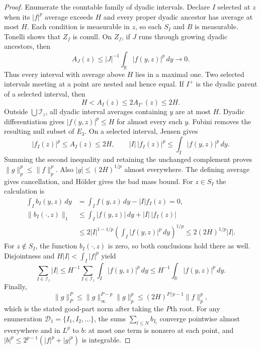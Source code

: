 \documentclass[12pt,reqno]{amsart}
\theoremstyle{plain}
\theoremstyle{definition}
\theoremstyle{remark}
\numberwithin{equation}{section}
\newcommand{\R}{\mathbb R}
\newcommand{\dd}{\,d}
\begin{document}
\begin{proof}
Enumerate the countable family of dyadic intervals. Declare $I$
selected at $z$ when its $|f|^p$ average exceeds $H$ and every
proper dyadic ancestor has average at most $H$. Each condition is
measurable in $z$, so each $S_I$ and $B$ is measurable. Tonelli
shows that $Z_f$ is conull. On $Z_f$, if $J$ runs through growing
dyadic ancestors, then
\[
 A_J(z)\le |J|^{-1}\int_\R|f(y,z)|^p\dd y\longrightarrow0.
\]
Thus every interval with average above $H$ lies in a maximal one.
Two selected intervals meeting at a point are nested and hence equal.
If $I^+$ is the dyadic parent of a selected interval, then
\[
 H<A_I(z)\le2A_{I^+}(z)\le2H.
\]
Outside $\bigcup\mathcal I_z$, all dyadic interval averages
containing $y$ are at most $H$. Dyadic differentiation gives
$|f(y,z)|^p\le H$ for almost every such $y$. Fubini removes the
resulting null subset of $E_3$. On a selected interval, Jensen gives
\[
 |f_I(z)|^p\le A_I(z)\le2H,\qquad
 |I|\,|f_I(z)|^p\le\int_I|f(y,z)|^p\dd y.
\]
Summing the second inequality and retaining the unchanged complement
proves $\|g\|_p^p\le\|f\|_p^p$. Also $|g|\le(2H)^{1/p}$
almost everywhere. The defining average gives cancellation, and
H\"older gives the bad mass bound. For $z\in S_I$ the calculation is
\begin{align*}
 \int_I b_I(y,z)\dd y&=\int_I f(y,z)\dd y-|I|f_I(z)=0,\\
 \|b_I(\cdot,z)\|_1
 &\le\int_I|f(y,z)|\dd y+|I|\,|f_I(z)|\\
 &\le2|I|^{1-1/p}\left(\int_I|f(y,z)|^p\dd y\right)^{1/p}
 \le2(2H)^{1/p}|I|.
\end{align*}
For $z\notin S_I$, the function $b_I(\cdot,z)$ is zero, so both
conclusions hold there as well.
Disjointness and $H|I|<\int_I|f|^p$ yield
\[
 \sum_{I\in\mathcal I_z}|I|
 \le H^{-1}\sum_{I\in\mathcal I_z}\int_I|f(y,z)|^p\dd y
 \le H^{-1}\int_\R|f(y,z)|^p\dd y.
\]
Finally,
\[
 \|g\|_P^P\le\|g\|_\infty^{P-p}\|g\|_p^p
 \le(2H)^{P/p-1}\|f\|_p^p,
\]
which is the stated good-part norm after taking the $P$th root.
For any enumeration $\mathcal D_1=\{I_1,I_2,\ldots\}$, the sums
$\sum_{l\le N}b_{I_l}$ converge pointwise almost everywhere and
in $L^p$ to $b$: at most one term is nonzero at each point, and
$|b|^p\le2^{p-1}(|f|^p+|g|^p)$ is integrable.
\end{proof}
\end{document}
